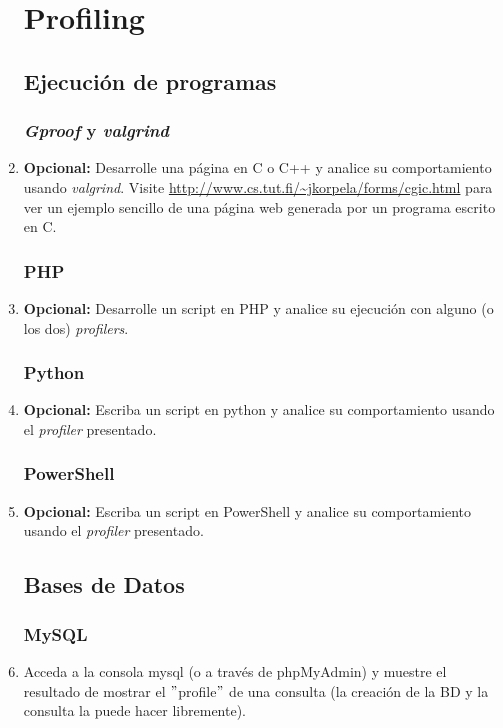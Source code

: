 \documentclass[paper=a4, fontsize=11pt]{scrartcl} %
\numberwithin{equation}{section} %
\numberwithin{figure}{section} %
\numberwithin{table}{section} %
\begin{document}
\begin{enumerate}
	\section{Profiling}
	\subsection{Ejecución de programas}
	\subsubsection{\textit{Gproof} y \textit{valgrind}}
		\item \textbf{Opcional:} Desarrolle una página en C o C++ y analice su comportamiento usando
		\textit{valgrind}. Visite \url{http://www.cs.tut.fi/~jkorpela/forms/cgic.html} para ver un
		ejemplo sencillo de una página web generada por un programa escrito en C.
		
	\subsubsection{PHP}
		\item \textbf{Opcional:} Desarrolle un script en PHP y analice su ejecución con alguno (o
		los dos) \textit{profilers}.
		
	\subsubsection{Python}
		\item \textbf{Opcional:} Escriba un script en python y analice su comportamiento usando el
		\textit{profiler} presentado.
		
	\subsubsection{PowerShell}
		\item \textbf{Opcional:} Escriba un script en PowerShell y analice su comportamiento
		usando el \textit{profiler} presentado.
		
	\subsection{Bases de Datos}
	\subsubsection{MySQL}
		\item Acceda a la consola mysql (o a través de phpMyAdmin) y muestre el resultado de mostrar
		el $"$profile$"$ de una consulta (la creación de la BD y la consulta la puede hacer libremente).
		

\end{enumerate}
\end{document}
